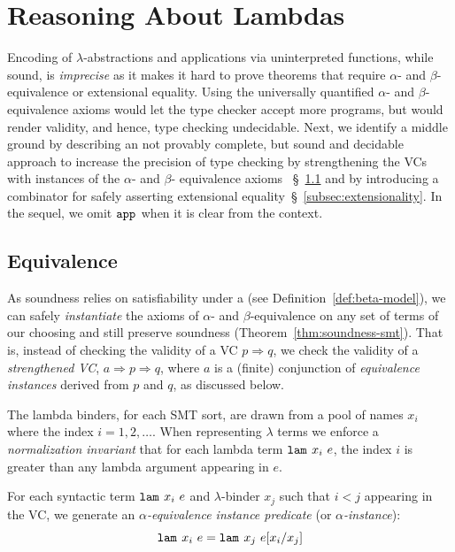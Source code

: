 \section{Reasoning About Lambdas}\label{sec:lambdas}

Encoding of $\lambda$-abstractions and applications via
uninterpreted functions, while sound, is \emph{imprecise}
as it makes it hard to prove theorems that require $\alpha$-
and $\beta$-equivalence or extensional equality.
%
Using the universally quantified $\alpha$- and
$\beta$- equivalence axioms would let the type checker
accept more programs, but would render validity, and
hence, type checking undecidable.
%
Next, we identify a middle ground by describing an
not provably complete, but sound and decidable approach to
increase the precision of type checking by
strengthening the VCs with instances of
the $\alpha$- and $\beta$- equivalence axioms
~\S~\ref{subsec:equivalences} and by introducing
a combinator for safely asserting extensional
equality~\S~\ref{subsec:extensionality}.
%
In the sequel, we omit $\texttt{app}^{}_{}$
when it is clear from the context.

\subsection{Equivalence}\label{subsec:equivalences}
%
As soundness relies on satisfiability under a
\bmodel  (see Definition~\ref{def:beta-model}),
we can safely \emph{instantiate} the axioms of
$\alpha$- and $\beta$-equivalence on any set of
terms of our choosing and still preserve soundness
(Theorem~\ref{thm:soundness-smt}).
%
That is, instead of checking the validity
of a VC
${p \Rightarrow q}$,
we check the validity of a \emph{strengthened VC},
${a \Rightarrow p \Rightarrow q}$,
where $a$ is a (finite) conjunction
of \emph{equivalence instances}
derived from $p$ and $q$,
as discussed below.

%
The lambda binders,
for each SMT sort, are drawn from a
pool of names $x_i$ where the index
$i=1,2,\ldots$.
%
When representing
$\lambda$ terms we enforce
a \emph{normalization invariant}
that for each lambda term
$\texttt{lam}^{}_{}\ {x_i}\ {e}$, the index $i$
is greater than any lambda
argument appearing in $e$.

For each syntactic term
${\texttt{lam}^{}_{}\ {x_i}\ {e}}$ and $\lambda$-binder
$x_j$ such that $i < j$ appearing in the VC,
we generate an \emph{$\alpha$-equivalence instance predicate}
(or \emph{$\alpha$-instance}):
$$\texttt{lam}^{}_{}\ {x_i}\ {e} = \texttt{lam}^{}_{}\ {x_j}\ {e [{x_i}/{x_j}]}$$

